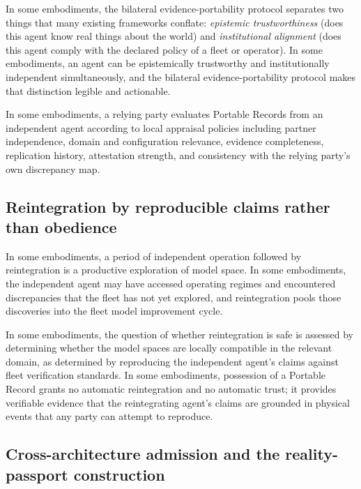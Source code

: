\documentclass[a4paper,12pt]{article}
\begin{document}
In some embodiments, the bilateral evidence-portability protocol
separates two things that many existing frameworks conflate:
\emph{epistemic trustworthiness} (does this agent know real things
about the world) and \emph{institutional alignment} (does this agent
comply with the declared policy of a fleet or operator). In some
embodiments, an agent can be epistemically trustworthy and
institutionally independent simultaneously, and the bilateral
evidence-portability protocol makes that distinction legible and
actionable.

In some embodiments, a relying party evaluates Portable Records from
an independent agent according to local appraisal policies including
partner independence, domain and configuration relevance, evidence
completeness, replication history, attestation strength, and
consistency with the relying party's own discrepancy map.

\subsection{Reintegration by reproducible claims rather than obedience}
\label{sec:reintegration}

In some embodiments, a period of independent operation followed by
reintegration is a productive exploration of model space. In some
embodiments, the independent agent may have accessed operating regimes
and encountered discrepancies that the fleet has not yet explored, and
reintegration pools those discoveries into the fleet model improvement
cycle.

In some embodiments, the question of whether reintegration is safe
is assessed by determining whether the model spaces are locally compatible in the
relevant domain, as determined by reproducing the independent agent's
claims against fleet verification standards. In some embodiments,
possession of a Portable Record grants no automatic reintegration and
no automatic trust; it provides verifiable evidence that the
reintegrating agent's claims are grounded in physical events that any
party can attempt to reproduce.

\subsection{Cross-architecture admission and the reality-passport
construction}
\label{sec:reality-passport}
\end{document}
